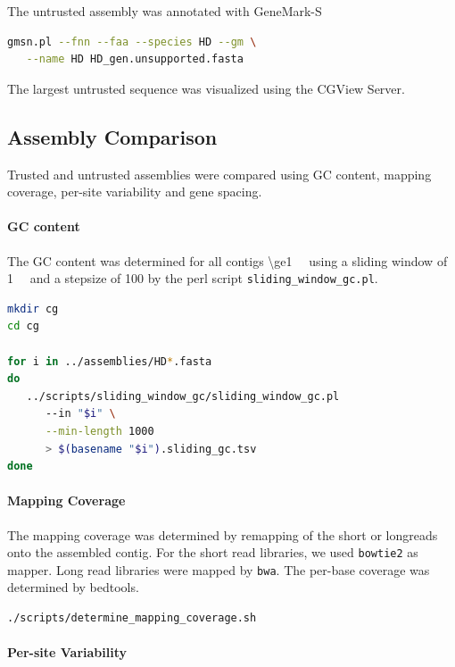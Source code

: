 \documentclass[12pt,a4paper]{scrartcl}
\begin{document}
The untrusted assembly was annotated with GeneMark-S

\begin{lstlisting}[language=bash]
gmsn.pl --fnn --faa --species HD --gm \
   --name HD HD_gen.unsupported.fasta
\end{lstlisting}

The largest untrusted sequence was visualized using the CGView Server.

\subsection*{Assembly Comparison}

Trusted and untrusted assemblies were compared using GC content,
mapping coverage, per-site variability and gene spacing.

\paragraph{GC content}
The GC content was determined for all contigs
\SI{\ge1}{\kilo\basepair} using a sliding window of
\SI{1}{\kilo\basepair} and a stepsize of \SI{100}{\basepair} by the
perl script \texttt{sliding\_window\_gc.pl}.

\begin{lstlisting}[language=bash]
mkdir cg
cd cg

for i in ../assemblies/HD*.fasta
do
   ../scripts/sliding_window_gc/sliding_window_gc.pl
      --in "$i" \
      --min-length 1000
      > $(basename "$i").sliding_gc.tsv
done
\end{lstlisting}

\paragraph{Mapping Coverage}
The mapping coverage was determined by remapping of the short or
longreads onto the assembled contig. For the short read libraries, we
used \texttt{bowtie2} as mapper. Long read libraries were mapped by
\texttt{bwa}. The per-base coverage was determined by bedtools.

\begin{lstlisting}[language=bash]
./scripts/determine_mapping_coverage.sh
\end{lstlisting}

\paragraph{Per-site Variability}
\end{document}
